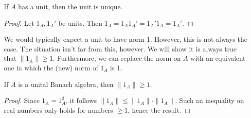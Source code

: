 \documentclass[12pt]{article}
\begin{document}
\begin{corollary}
	If $A$ has a unit, then the unit is unique.
\end{corollary}
\begin{proof}
	Let $1_A, 1_A'$ be units. Then $1_A = 1_A1_A' = 1_A'1_A = 1_A'$.
\end{proof}

We would typically expect a unit to have norm 1. However, this is not always the case. The situation isn't far from this, however. We will show it is always true that $\|1_A\|\geq 1$. Furthermore, we can replace the norm on $A$ with an equivalent one in which the (new) norm of $1_A$ is 1.

\begin{proposition}
	If $A$ is a unital Banach algebra, then $\|1_A\|\geq 1$.
\end{proposition}
\begin{proof}
	Since $1_A = 1_A^2$, it follows $\|1_A\| \leq \|1_A\| \cdot \|1_A\|$. Such an inequality on real numbers only holds for numbers $\geq 1$, hence the result.
\end{proof}
\end{document}
